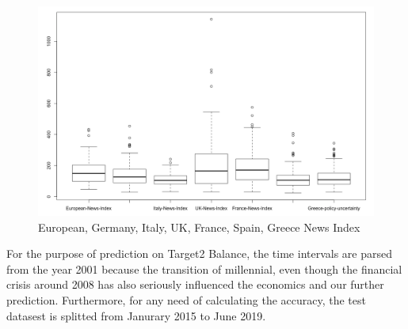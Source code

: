 \documentclass[12pt]{article}
\begin{document}
\begin{figure}
  \centering 
  \includegraphics[width=\linewidth]{Uncertainty.png}
  \caption{European, Germany, Italy, UK, France, Spain, Greece News Index}
  \label{fig:policy_uncertainty}
\end{figure}
For the purpose of prediction on Target2 Balance, the time intervals are parsed from the year 2001 because the transition of millennial, even though the financial crisis around 2008 has also seriously influenced the economics and our further prediction. Furthermore, for any need of calculating the accuracy, the test datasest is splitted from Janurary 2015 to June 2019. 
\end{document}
